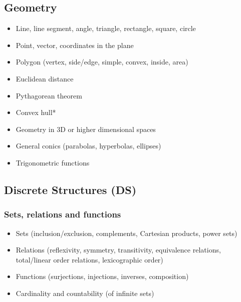 \documentclass[12pt]{article}
\begin{document}
	\subsection{Geometry}
		\begin{itemize}[label=]
			\item Line, line segment, angle, triangle, rectangle, square, circle
			\item Point, vector, coordinates in the plane
			\item Polygon (vertex, side/edge, simple, convex, inside, area)
			\item Euclidean distance
			\item Pythagorean theorem
		\end{itemize}
	
		\begin{itemize}[label=]
			\item Convex hull*
			\item Geometry in 3D or higher dimensional spaces 
			\item General conics (parabolas, hyperbolas, ellipses)
			\item Trigonometric functions
		\end{itemize}
	
	\subsection{Discrete Structures (DS)}
		\newcommand{\type}{DS}
		\subsubsection{Sets, relations and functions}
		\begin{itemize}[label=]
			\item Sets (inclusion/exclusion, complements, Cartesian products, power sets)
			\item Relations (reflexivity, symmetry, transitivity, equivalence relations, total/linear order relations, lexicographic order)
			\item Functions (surjections, injections, inverses, composition)
		\end{itemize}
		
		\begin{itemize}[label=]
			\item Cardinality and countability (of infinite sets)
		\end{itemize}
		
\end{document}
